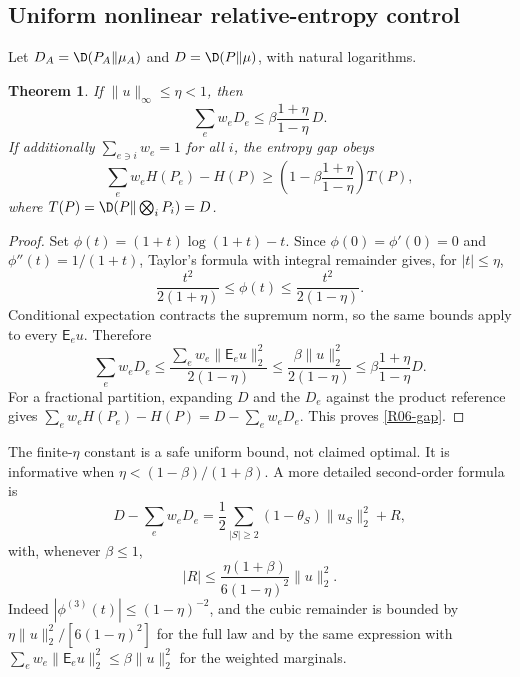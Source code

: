 \documentclass[11pt,a4paper]{article}
\newtheorem{theorem}{Theorem}[section]
\theoremstyle{definition}\newtheorem{definition}[theorem]{Definition}
\theoremstyle{remark}\newtheorem{remark}[theorem]{Remark}
\numberwithin{equation}{section}
\begin{document}
\subsection{Uniform nonlinear relative-entropy control}\label{R06-sec-3}
Let $D_A=\D(P_A\Vert\mu_A)$ and $D=\D(P\Vert\mu)$, with natural logarithms.
\begin{theorem}\label{R06-nonlinear}
If $\|u\|_\infty\leq\eta<1$, then
\begin{equation}\label{R06-nonlinearbound}
\sum_e w_eD_e\leq\beta\frac{1+\eta}{1-\eta}\,D.
\end{equation}
If additionally $\sum_{e\ni i}w_e=1$ for all $i$, the entropy gap obeys
\begin{equation}\label{R06-gap}
\sum_e w_eH(P_e)-H(P)
\geq\left(1-\beta\frac{1+\eta}{1-\eta}\right)T(P),
\end{equation}
where $T(P)=\D(P\Vert\bigotimes_iP_i)=D$.
\end{theorem}
\begin{proof}
Set $\phi(t)=(1+t)\log(1+t)-t$. Since $\phi(0)=\phi'(0)=0$ and $\phi''(t)=1/(1+t)$, Taylor's formula with integral remainder gives, for $|t|\leq\eta$,
\[
\frac{t^2}{2(1+\eta)}\leq\phi(t)\leq\frac{t^2}{2(1-\eta)}.
\]
Conditional expectation contracts the supremum norm, so the same bounds apply to every $\mathsf E_eu$. Therefore
\[
\sum_e w_eD_e\leq\frac{\sum_ew_e\|\mathsf E_eu\|_2^2}{2(1-\eta)}
\leq\frac{\beta\|u\|_2^2}{2(1-\eta)}
\leq\beta\frac{1+\eta}{1-\eta}D.
\]
For a fractional partition, expanding $D$ and the $D_e$ against the product reference gives $\sum_e w_eH(P_e)-H(P)=D-\sum_ew_eD_e$. This proves \eqref{R06-gap}.
\end{proof}
The finite-$\eta$ constant is a safe uniform bound, not claimed optimal. It is informative when $\eta<(1-\beta)/(1+\beta)$. A more detailed second-order formula is
\[
D-\sum_ew_eD_e
=\frac12\sum_{|S|\geq2}(1-\theta_S)\|u_S\|_2^2+R,
\]
with, whenever $\beta\leq1$,
\[
|R|\leq\frac{\eta(1+\beta)}{6(1-\eta)^2}\|u\|_2^2.
\]
Indeed $|\phi^{(3)}(t)|\leq(1-\eta)^{-2}$, and the cubic remainder is bounded by $\eta\|u\|_2^2/[6(1-\eta)^2]$ for the full law and by the same expression with $\sum_ew_e\|\mathsf E_eu\|_2^2\leq\beta\|u\|_2^2$ for the weighted marginals.
\end{document}
